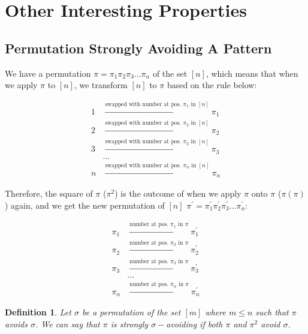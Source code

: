\documentclass[12pt]{article}
\newtheorem{defn}{Definition} %
\begin{document}
\section{Other Interesting Properties}

\subsection{Permutation Strongly Avoiding A Pattern}

We have a permutation $\pi = \pi_1\pi_2\pi_3\ldots\pi_n$ of the set $[n]$, which means that when we apply $\pi$ to $[n]$, we transform $[n]$ to $\pi$ based on the rule below: 

\begin{centering}
   \begin{align*}
    1 &\xrightarrow{\text{swapped with number at pos. $\pi_1$ in $[n]$}} \pi_1\\
    2 &\xrightarrow{\text{swapped with number at pos. $\pi_2$ in $[n]$}} \pi_2\\
    3 &\xrightarrow{\text{swapped with number at pos. $\pi_3$ in $[n]$}} \pi_3\\
    &\ldots\\
    n &\xrightarrow{\text{swapped with number at pos. $\pi_n$ in $[n]$}} \pi_n
\end{align*} 
\end{centering}

Therefore, the square of $\pi$ ($\pi^2$) is the outcome of when we apply $\pi$ onto $\pi$ ($\pi(\pi)$) again, and we get the new permutation of $[n]$ $\pi^{'} = \pi^{'}_1\pi^{'}_2\pi^{'}_3\ldots \pi^{'}_n$:

\begin{centering}
   \begin{align*}
    \pi_1 &\xrightarrow{\text{number at pos. $\pi_1$ in $\pi$}} \pi_1^{'}\\
    \pi_2 &\xrightarrow{\text{number at pos. $\pi_2$ in $\pi$}} \pi_2^{'}\\
    \pi_3 &\xrightarrow{\text{number at pos. $\pi_3$ in $\pi$}} \pi_3^{'}\\
    &\ldots\\
    \pi_n &\xrightarrow{\text{number at pos. $\pi_n$ in $\pi$}} \pi_n^{'}
\end{align*} 
\end{centering}

\begin{defn}
    Let $\sigma$ be a permutation of the set $[m]$ where $m \leq n$ such that $\pi$ avoids $\sigma$. We can say that $\pi$ is strongly $\sigma-$avoiding if both $\pi$ and $\pi^2$ avoid $\sigma$.
\end{defn}
\end{document}
